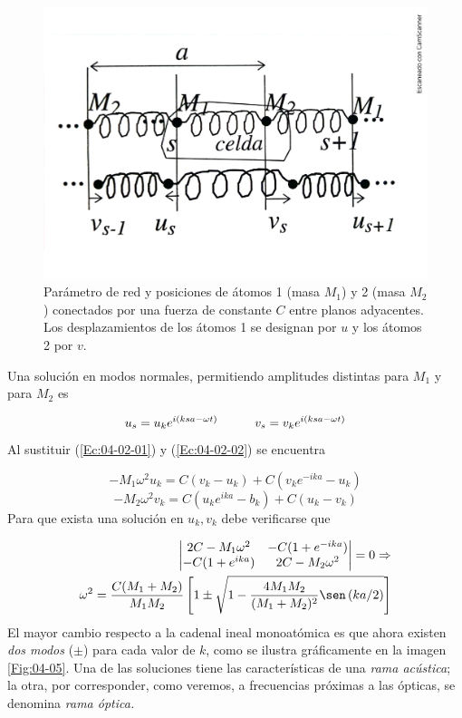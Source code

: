 \begin{figure}[h!] \centering
    \includegraphics[scale=0.4]{Cuerpo/Ch_04/Fotos libro 4.pdf}
    \caption{Parámetro de red y posiciones de átomos 1 (masa $M_1$) y 2 (masa $M_2$) conectados por una fuerza de constante $C$ entre planos adyacentes. Los desplazamientos de los átomos 1 se designan por $u$ y los átomos 2 por $v$.}
    \label{Fig:04-04}
\end{figure}    

Una solución en modos normales, permitiendo amplitudes distintas para $M_1$ y para $M_2$ es 

\begin{equation}
	u_s = u_k e^{i(ksa-\omega  t)} \quad \quad \quad v_s = v_k e^{i(ksa-\omega t)} \label{Ec:04-02-02}
\end{equation}
Al sustituir (\ref{Ec:04-02-01}) y (\ref{Ec:04-02-02}) se encuentra 

\begin{equation}
    -M_1 \omega^2 u_k = C(v_k - u_k) + C(v_k e^{-ika}-u_k)
\end{equation}
\begin{equation*}
    -M_2 \omega^2 v_k = C(u_k e^{ika} - b_k) + C(u_k - v_k)    
\end{equation*}
Para que exista una solución en $u_k,v_k$ debe verificarse que

\begin{eqnarray}
    \begin{vmatrix}
        2C - M_1\omega^2 & -C(1+e^{-ika})\\
        -C (1+e^{ika}) & 2C - M_2 \omega^2  
    \end{vmatrix}= 0 \Rightarrow \\
    \omega^2 = \frac{C(M_1+M_2)}{M_1M_2} \ccorchetes{1 \pm \sqrt{1-\frac{4M_1M_2}{(M_1+M_2)^2} \sen \parentesis{  ka/2}}}
\end{eqnarray}
El mayor cambio respecto a la cadenal ineal monoatómica es que ahora existen \textit{dos modos} ($\pm$) para cada valor de $k$, como se ilustra gráficamente en la imagen \ref{Fig:04-05}. Una de las soluciones tiene las características de una \textit{rama acústica}; la otra, por corresponder, como veremos, a frecuencias próximas a las ópticas, se denomina \textit{rama óptica.}


